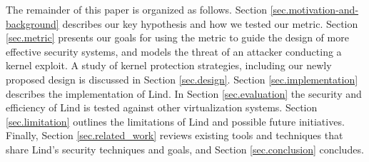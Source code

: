 The remainder of this paper is organized as follows.
Section \ref{sec.motivation-and-background} describes our key hypothesis and
how we tested our metric.
Section \ref{sec.metric} presents our goals for using the metric to guide the design
of more effective security systems, and models the threat of an attacker conducting
a kernel exploit. A study of kernel
protection strategies, including our newly proposed design
is discussed in Section \ref{sec.design}. Section \ref{sec.implementation}
describes the implementation of Lind. In Section \ref{sec.evaluation} the security and
efficiency of Lind is tested against other virtualization systems.
Section \ref{sec.limitation} outlines the
limitations of Lind and possible future initiatives.
Finally, Section \ref{sec.related_work} reviews existing tools and techniques that share
Lind's security techniques and goals, and Section \ref{sec.conclusion} concludes.






